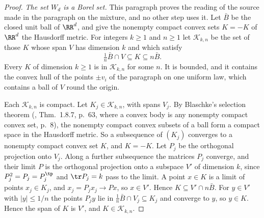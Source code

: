 \begin{proof}
\emph{The set $W_d$ is a Borel set.} This paragraph proves the reading of the source made in the
paragraph on the mixture, and no other step uses it. Let $\bar B$ be the closed unit ball of
$\RR^d$, and give the nonempty compact convex sets $K = -K$ of $\RR^d$ the Hausdorff metric. For
integers $k \ge 1$ and $n \ge 1$ let $\mathcal{K}_{k,n}$ be the set of those $K$ whose span $V$
has dimension $k$ and which satisfy
\[
  \tfrac1n\bar B \cap V \subseteq K \subseteq n\bar B .
\]
Every $K$ of dimension $k \ge 1$ is in $\mathcal{K}_{k,n}$ for some $n$. It is bounded, and it
contains the convex hull of the points $\pm v_i$ of the paragraph on one uniform law, which
contains a ball of $V$ round the origin.

Each $\mathcal{K}_{k,n}$ is compact. Let $K_j \in \mathcal{K}_{k,n}$, with spans $V_j$. By
Blaschke's selection theorem (, Thm.~1.8.7, p.~63, where a convex
body is any nonempty compact convex set, p.~8), the nonempty compact convex subsets of a ball
form a compact space in the Hausdorff metric. So a subsequence of $(K_j)$ converges to a nonempty compact convex set
$K$, and $K = -K$. Let $P_j$ be the orthogonal projection onto $V_j$. Along a further subsequence
the matrices $P_j$ converge, and their limit $P$ is the orthogonal projection onto a subspace $V'$
of dimension $k$, since $P_j^2 = P_j = P_j^{\tp}$ and $\tr P_j = k$ pass to the limit. A point
$x \in K$ is a limit of points $x_j \in K_j$, and $x_j = P_jx_j \to Px$, so $x \in V'$. Hence
$K \subseteq V' \cap n\bar B$. For $y \in V'$ with $|y| \le 1/n$ the points $P_jy$ lie in
$\tfrac1n\bar B \cap V_j \subseteq K_j$ and converge to $y$, so $y \in K$. Hence the span of $K$
is $V'$, and $K \in \mathcal{K}_{k,n}$.


\end{proof}
